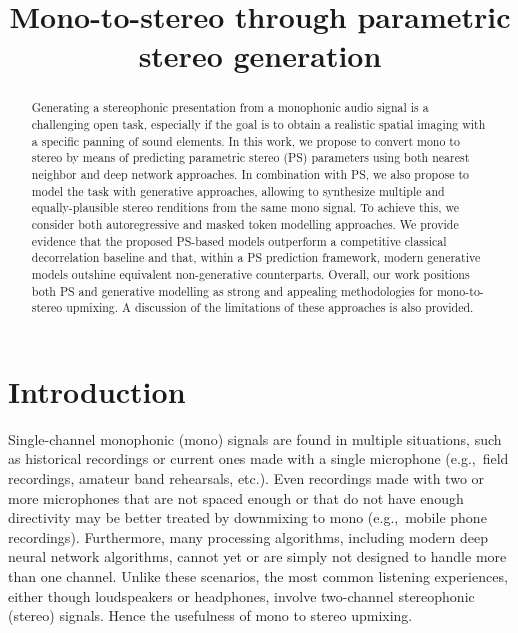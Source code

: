 \documentclass{article}
\title{Mono-to-stereo through parametric stereo generation}
\begin{document}
\maketitle

\begin{abstract}
Generating a stereophonic presentation from a monophonic audio signal is a challenging open task, especially if the goal is to obtain a realistic spatial imaging with a specific panning of sound elements. In this work, we propose to convert mono to stereo by means of predicting parametric stereo (PS) parameters using both nearest neighbor and deep network approaches. In combination with PS, we also propose to model the task with generative approaches, allowing to synthesize multiple and equally-plausible stereo renditions from the same mono signal. To achieve this, we consider both autoregressive and masked token modelling approaches. We provide evidence that the proposed PS-based models outperform a competitive classical decorrelation baseline and that, within a PS prediction framework, modern generative models outshine equivalent non-generative counterparts. Overall, our work positions both PS and generative modelling as strong and appealing methodologies for mono-to-stereo upmixing. A discussion of the limitations of these approaches is also provided.
\end{abstract}

\section{Introduction}
\label{sec:intro}

Single-channel monophonic (mono) signals are found in multiple situations, such as historical recordings or current ones made with a single microphone (e.g.,~field recordings, amateur band rehearsals, etc.). Even recordings made with two or more microphones that are not spaced enough or that do not have enough directivity may be better treated by downmixing to mono (e.g.,~mobile phone recordings). Furthermore, many processing algorithms, including modern deep neural network algorithms, cannot yet or are simply not designed to handle more than one channel. 
Unlike these scenarios, the most common listening experiences, either though loudspeakers or headphones,  involve two-channel stereophonic (stereo) signals. Hence the usefulness of mono to stereo upmixing.
\end{document}
